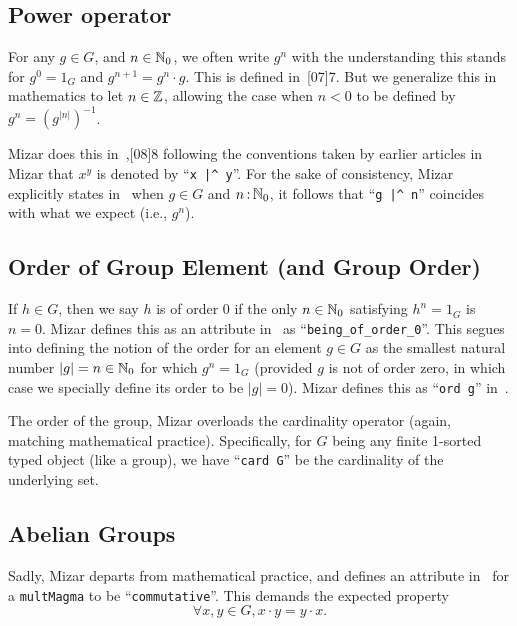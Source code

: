 \subsection{Power operator}
For any $g\in G$, and $n\in\mathbb{N}_{0}$, we often write $g^{n}$ with the
understanding this stands for $g^{0}=1_{G}$ and $g^{n+1}=g^{n}\cdot g$.
This is defined in~[07]{7}. But we generalize this in
mathematics to let $n\in\mathbb{Z}$, allowing the case when $n<0$ to be defined
by $g^{n} = (g^{|n|})^{-1}$.

Mizar does this in~,[08]{8}
following the conventions taken by earlier articles in Mizar that
$x^{y}$ is denoted by ``\lstinline{x |^ y}''.
For the sake of consistency, Mizar explicitly states in~
when $g\in G$ and $n\mathop{:}\nolimits \mathbb{N}_{0}$, it follows
that ``\lstinline{g |^ n}'' coincides with what we expect (i.e., $g^{n}$).

\subsection{Order of Group Element (and Group Order)}
If $h\in G$, then we say $h$ is of order 0 if the only $n\in\mathbb{N}_{0}$
satisfying $h^{n}=1_{G}$ is $n=0$. Mizar defines this as an attribute
in~ as ``\lstinline{being_of_order_0}''.
This segues into defining the notion of the order for an element $g\in G$
as the smallest natural number $|g|=n\in\mathbb{N}_{0}$ for which $g^{n}=1_{G}$
(provided $g$ is not of order zero, in which case we specially define
its order to be $|g|=0$). Mizar defines this as
``\lstinline{ord g}''
in~.

The order of the group, Mizar overloads the cardinality operator (again,
matching mathematical practice). Specifically,
for $G$ being any finite 1-sorted typed object (like a group), we have
``\lstinline{card G}'' be the cardinality
of the underlying set.

\subsection{Abelian Groups}
Sadly, Mizar departs from mathematical practice, and defines an
attribute in~ for a
\lstinline{multMagma} to be ``\lstinline{commutative}''.
This demands the expected property
\begin{equation*}
  \forall x,y\in G, x\cdot y=y\cdot x.
\end{equation*}
